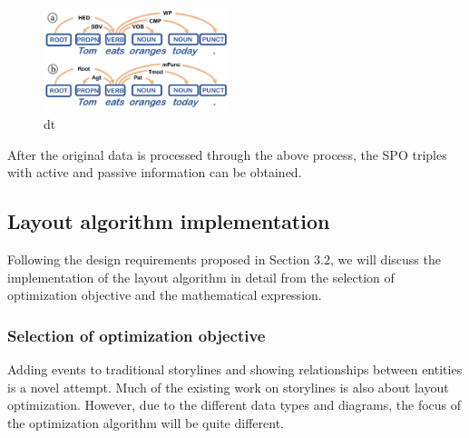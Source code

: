 \begin{figure}[h]
	\centering
	\includegraphics[width=0.48\textwidth]{Fig/dt1.pdf}
	\vspace{-0.5em}
	\caption{dt}
	\vspace{-1.5em}
	\label{fig:DT}
\end{figure} 

After the original data is processed through the above process, the SPO triples with active and passive information can be obtained.

\subsection{Layout algorithm implementation}
\noindent  Following the design requirements proposed in Section 3.2, we will discuss the implementation of the layout algorithm in detail from the selection of optimization objective and the mathematical expression.

\subsubsection{Selection of optimization objective}
\noindent Adding events to traditional storylines and showing relationships between entities is a novel attempt. Much of the existing work on storylines is also about layout optimization. However, due to the different data types and diagrams, the focus of the optimization algorithm will be quite different. 

